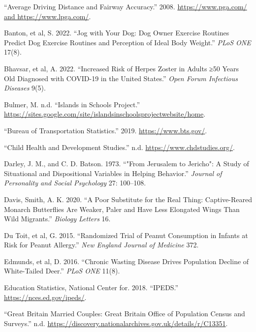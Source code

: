 \documentclass[
]{report}
\newlength{\cslhangindent}
\newenvironment{CSLReferences}[2] %
 {\begin{list}{}{%
  \setlength{\itemindent}{0pt}
  \setlength{\leftmargin}{0pt}
  \setlength{\parsep}{0pt}
  \ifodd #1
   \setlength{\leftmargin}{\cslhangindent}
   \setlength{\itemindent}{-1\cslhangindent}
  \fi
  \setlength{\itemsep}{#2\baselineskip}}}
 {\end{list}}
\begin{document}
\label{refs}
\begin{CSLReferences}{1}{0}
{``Average Driving Distance and Fairway Accuracy.''} 2008. \href{https://www.pga.com/\%20and\%20https://www.lpga.com/}{https://www.pga.com/ and https://www.lpga.com/}.

Banton, et al, S. 2022. {``Jog with Your Dog: Dog Owner Exercise Routines Predict Dog Exercise Routines and Perception of Ideal Body Weight.''} \emph{PLoS ONE} 17(8).

Bhavsar, et al, A. 2022. {``Increased Risk of Herpes Zoster in Adults ≥50 Years Old Diagnosed with COVID-19 in the United States.''} \emph{Open Forum Infectious Diseases} 9(5).

Bulmer, M. n.d. {``Islands in Schools Project.''} \url{https://sites.google.com/site/islandsinschoolsprojectwebsite/home}.

{``Bureau of Transportation Statistics.''} 2019. \url{https://www.bts.gov/}.

{``Child Health and Development Studies.''} n.d. \url{https://www.chdstudies.org/}.

Darley, J. M., and C. D. Batson. 1973. {``"From Jerusalem to Jericho": A Study of Situational and Dispositional Variables in Helping Behavior.''} \emph{Journal of Personality and Social Psychology} 27: 100--108.

Davis, Smith, A. K. 2020. {``A Poor Substitute for the Real Thing: Captive-Reared Monarch Butterflies Are Weaker, Paler and Have Less Elongated Wings Than Wild Migrants.''} \emph{Biology Letters} 16.

Du Toit, et al, G. 2015. {``Randomized Trial of Peanut Consumption in Infants at Risk for Peanut Allergy.''} \emph{New England Journal of Medicine} 372.

Edmunds, et al, D. 2016. {``Chronic Wasting Disease Drives Population Decline of White-Tailed Deer.''} \emph{PLoS ONE} 11(8).

Education Statistics, National Center for. 2018. {``IPEDS.''} \url{https://nces.ed.gov/ipeds/}.

{``Great Britain Married Couples: Great Britain Office of Population Census and Surveys.''} n.d. \url{https://discovery.nationalarchives.gov.uk/details/r/C13351}.


\end{CSLReferences}
\end{document}
